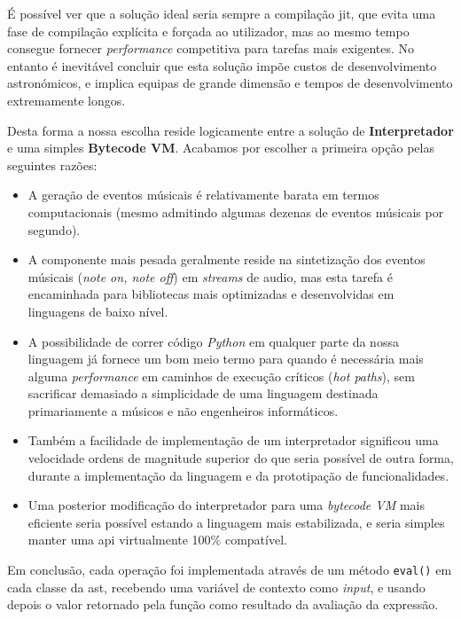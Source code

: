  É possível ver que a solução ideal seria sempre a compilação \acrfull{jit}, que evita uma fase de compilação explícita e forçada ao utilizador, mas ao mesmo tempo consegue fornecer \textit{performance} competitiva para tarefas mais exigentes. No entanto é inevitável concluir que esta solução impõe custos de desenvolvimento astronómicos, e implica equipas de grande dimensão e tempos de desenvolvimento extremamente longos.
 
 Desta forma a nossa escolha reside logicamente entre a solução de \textbf{Interpretador} e uma simples \textbf{Bytecode VM}. Acabamos por escolher a primeira opção pelas seguintes razões:
 \begin{itemize}
  \item A geração de eventos músicais é relativamente barata em termos computacionais (mesmo admitindo algumas dezenas de eventos músicais por segundo).
  \item A componente mais pesada geralmente reside na sintetização dos eventos músicais (\textit{note on, note off}) em \textit{streams} de audio, mas esta tarefa é encaminhada para bibliotecas mais optimizadas e desenvolvidas em linguagens de baixo nível.
  \item A possibilidade de correr código \textit{Python} em qualquer parte da nossa linguagem já fornece um bom meio termo para quando é necessária mais alguma \textit{performance} em caminhos de execução críticos (\textit{hot paths}), sem sacrificar demasiado a simplicidade de uma linguagem destinada primariamente a músicos e não engenheiros informáticos.
  \item Também a facilidade de implementação de um interpretador significou uma velocidade ordens de magnitude superior do que seria possível de outra forma, durante a implementação da linguagem e da prototipação de funcionalidades.
  \item Uma posterior modificação do interpretador para uma \textit{bytecode VM} mais eficiente seria possível estando a linguagem mais estabilizada, e seria simples manter uma \acrshort{api} virtualmente 100\% compatível.
 \end{itemize}

 Em conclusão, cada operação foi implementada através de um método \texttt{eval()} em cada classe da \acrshort{ast}, recebendo uma variável de contexto como \textit{input}, e usando depois o valor retornado pela função como resultado da avaliação da expressão.
 
